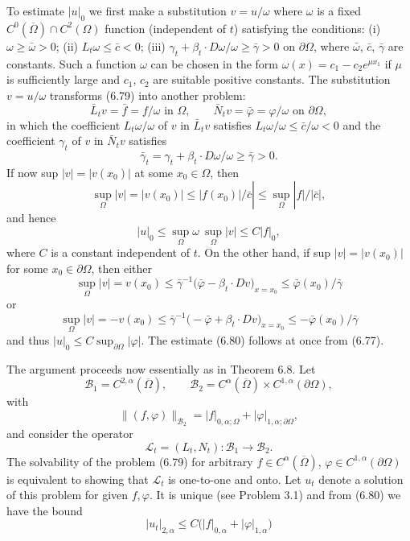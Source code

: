 To estimate $|u|_0$ we first make a substitution $v=u/\omega$ where $\omega$ is a fixed $C^0(\overline{\Omega})\cap C^2(\Omega)$ function (independent of $t$) satisfying the conditions:
(i) $\omega\ge \bar{\omega}>0$;
(ii) $L_t\omega\le \bar{c}<0$;
(iii) $\gamma_t+\beta_t\cdot D\omega/\omega\ge \bar{\gamma}>0$ on $\partial\Omega$, where $\bar{\omega}$, $\bar{c}$, $\bar{\gamma}$ are constants.
Such a function $\omega$ can be chosen in the form $\omega(x)=c_1-c_2 e^{\mu x_1}$ if $\mu$ is sufficiently large and $c_1$, $c_2$ are suitable positive constants.
The substitution $v=u/\omega$ transforms (6.79) into another problem:
\[
\bar{L}_t v=\bar{f}=f/\omega \text{ in } \Omega,\qquad \bar{N}_t v=\bar{\varphi}=\varphi/\omega \text{ on } \partial\Omega,
\]
in which the coefficient $L_t\omega/\omega$ of $v$ in $\bar{L}_t v$ satisfies $L_t\omega/\omega\le \bar{c}/\omega<0$ and the coefficient $\gamma_t$ of $v$ in $\bar{N}_t v$ satisfies
\[
\bar{\gamma}_t=\gamma_t+\beta_t\cdot D\omega/\omega\ge \bar{\gamma}>0.
\]
If now sup $|v|=|v(x_0)|$ at some $x_0\in\Omega$, then
\[
\sup_{\Omega}|v|=|v(x_0)|\le |f(x_0)|/\bar{c}|\le \sup_{\Omega}|f|/|\bar{c}|,
\]
and hence
\[
|u|_0\le \sup_{\Omega}\omega\ \sup_{\Omega}|v|\le C|f|_0,
\]
where $C$ is a constant independent of $t$.
On the other hand, if sup $|v|=|v(x_0)|$ for some $x_0\in\partial\Omega$, then either
\[
\sup_{\Omega}|v|=v(x_0)\le \bar{\gamma}^{-1}\bigl(\bar{\varphi}-\beta_t\cdot Dv\bigr)_{x=x_0}\le \bar{\varphi}(x_0)/\bar{\gamma}
\]
or
\[
\sup_{\Omega}|v|=-v(x_0)\le \bar{\gamma}^{-1}\bigl(-\bar{\varphi}+\beta_t\cdot Dv\bigr)_{x=x_0}\le -\bar{\varphi}(x_0)/\bar{\gamma}
\]
and thus $|u|_0\le C\sup_{\partial\Omega}|\varphi|$.
The estimate (6.80) follows at once from (6.77).

The argument proceeds now essentially as in Theorem 6.8. Let
\[
\mathscr{B}_1=C^{2,\alpha}(\overline{\Omega}),\qquad \mathscr{B}_2=C^{\alpha}(\overline{\Omega})\times C^{1,\alpha}(\partial\Omega),
\]
with
\[
\|(f,\varphi)\|_{\mathscr{B}_2}=|f|_{0,\alpha;\Omega}+|\varphi|_{1,\alpha;\partial\Omega},
\]
and consider the operator
\[
\mathcal{L}_t=(L_t,N_t):\mathscr{B}_1\to \mathscr{B}_2.
\]
The solvability of the problem (6.79) for arbitrary $f\in C^{\alpha}(\overline{\Omega})$, $\varphi\in C^{1,\alpha}(\partial\Omega)$ is equivalent to showing that $\mathcal{L}_t$ is one-to-one and onto.
Let $u_t$ denote a solution of this problem for given $f,\varphi$.
It is unique (see Problem 3.1) and from (6.80) we have the bound
\[
|u_t|_{2,\alpha}\le C\bigl(|f|_{0,\alpha}+|\varphi|_{1,\alpha}\bigr)
\]


